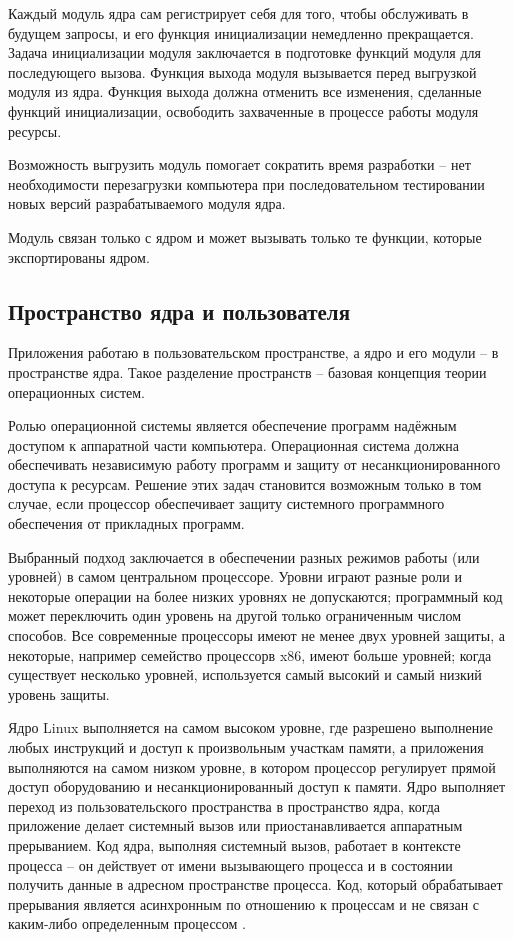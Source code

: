 Каждый модуль ядра сам регистрирует себя для того, чтобы обслуживать в будущем запросы, и его функция инициализации немедленно прекращается. Задача инициализации модуля заключается в подготовке функций модуля для последующего вызова. Функция выхода модуля вызывается перед выгрузкой модуля из ядра. Функция выхода должна отменить все изменения, сделанные функций инициализации, освободить захваченные в процессе работы модуля ресурсы. 

Возможность выгрузить модуль помогает сократить время разработки -- нет необходимости перезагрузки компьютера при последовательном тестировании новых версий разрабатываемого модуля ядра.

Модуль связан только с ядром и может вызывать только те функции, которые экспортированы ядром.

\subsection{Пространство ядра и пользователя}

Приложения работаю в пользовательском пространстве, а ядро и его модули -- в пространстве ядра. Такое разделение пространств -- базовая концепция теории операционных систем.

Ролью операционной системы является обеспечение программ надёжным доступом к аппаратной части компьютера. Операционная система должна обеспечивать независимую работу программ и защиту от несанкционированного доступа к ресурсам. Решение этих задач становится возможным только в том случае, если процессор обеспечивает защиту системного программного обеспечения от прикладных программ.

Выбранный подход заключается в обеспечении разных режимов работы (или уровней) в самом центральном процессоре. Уровни играют разные роли и некоторые операции на более низких уровнях не допускаются; программный код может переключить один уровень на другой только ограниченным числом способов. Все современные процессоры имеют не менее двух уровней защиты, а некоторые, например семейство процессорв x86, имеют больше уровней; когда существует несколько уровней, используется самый высокий и самый низкий уровень защиты. 

Ядро Linux выполняется на самом высоком уровне, где разрешено выполнение любых инструкций и доступ к произвольным участкам памяти, а приложения выполняются на самом низком уровне, в котором процессор регулирует прямой доступ оборудованию и несанкционированный доступ к памяти. Ядро выполняет переход из пользовательского пространства в пространство ядра, когда приложение делает системный вызов или приостанавливается аппаратным прерыванием. Код ядра, выполняя системный вызов, работает в контексте процесса -- он действует от имени вызывающего процесса и в состоянии получить данные в адресном пространстве процесса. Код, который обрабатывает прерывания является асинхронным по отношению к процессам и не связан с каким-либо определенным процессом \cite{habr-profiling-linux}.

